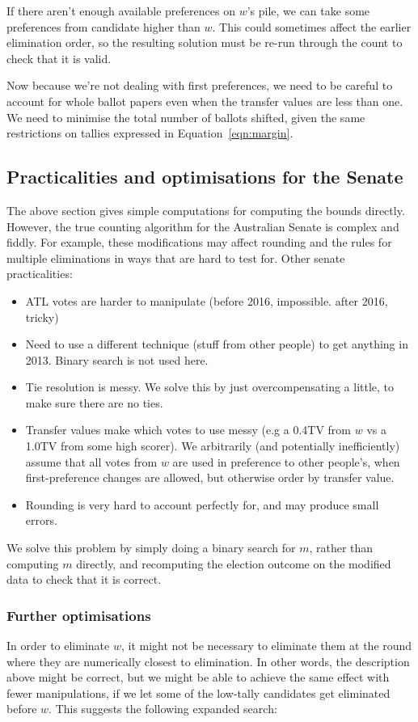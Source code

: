 \documentclass[10pt,a4paper]{article}
\begin{document}
{If there aren't enough available preferences on $w$'s pile, we can take some preferences from candidate higher than $w$.  This could sometimes affect the earlier elimination order, so the resulting solution must be re-run through the count to check that it is valid.

Now because we're not dealing with first preferences, we need to be careful to account for whole ballot papers even when the transfer values are less than one.  We need to minimise the total number of ballots shifted, given the same restrictions on tallies expressed in Equation~\ref{eqn:margin}.


\subsection{Practicalities and optimisations for the Senate}
The above section gives simple computations for computing the bounds directly.  However, the true counting algorithm for the Australian Senate is complex and fiddly.  For example, these modifications may affect rounding and the rules for multiple eliminations in ways that are hard to test for.  Other senate practicalities:
\begin{itemize}
\item  ATL votes are harder to manipulate (before 2016, impossible. after 2016, tricky)
\item  Need to use a different technique (stuff from other people) to get anything in 2013. Binary search is not used here.
\item  Tie resolution is messy.  We solve this by just overcompensating a little, to make sure there are no ties.
\item  Transfer values make which votes  to use messy (e.g a 0.4TV from $w$ vs a 1.0TV from some high scorer). We arbitrarily (and potentially inefficiently) assume that all votes from $w$ are used in preference to other people’s, when first-preference changes are allowed, but otherwise order by transfer value.    
\item Rounding is very hard to account perfectly for, and may produce small errors.
\end{itemize}

We solve this problem by simply doing a binary search for $m$, rather than computing $m$ directly, and recomputing the election outcome on the modified data to check that it is correct. 

\subsubsection{Further optimisations}
In order to eliminate $w$, it might not be necessary to eliminate them at the round where they are numerically closest to elimination.  In other words, the description above might be correct, but we might be able to achieve the same effect with fewer manipulations, if we let some of the low-tally candidates get eliminated before $w$.  This suggests the following expanded search:

}
\end{document}

